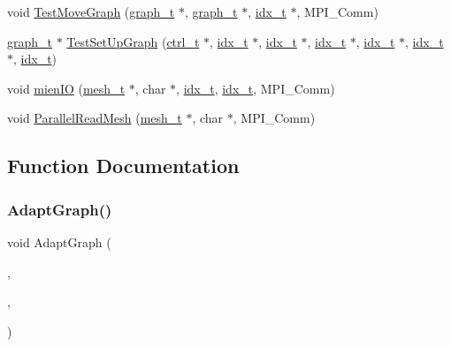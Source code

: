 \begin{DoxyCompactItemize}
\item 
void \hyperlink{a00954_a646249107ea9150124408b418ad61f15}{Test\+Move\+Graph} (\hyperlink{a00734}{graph\+\_\+t} $\ast$, \hyperlink{a00734}{graph\+\_\+t} $\ast$, \hyperlink{a00876_aaa5262be3e700770163401acb0150f52}{idx\+\_\+t} $\ast$, M\+P\+I\+\_\+\+Comm)
\item 
\hyperlink{a00734}{graph\+\_\+t} $\ast$ \hyperlink{a00954_a7a8b23842a3717196aec03bb4b8704bd}{Test\+Set\+Up\+Graph} (\hyperlink{a00742}{ctrl\+\_\+t} $\ast$, \hyperlink{a00876_aaa5262be3e700770163401acb0150f52}{idx\+\_\+t} $\ast$, \hyperlink{a00876_aaa5262be3e700770163401acb0150f52}{idx\+\_\+t} $\ast$, \hyperlink{a00876_aaa5262be3e700770163401acb0150f52}{idx\+\_\+t} $\ast$, \hyperlink{a00876_aaa5262be3e700770163401acb0150f52}{idx\+\_\+t} $\ast$, \hyperlink{a00876_aaa5262be3e700770163401acb0150f52}{idx\+\_\+t} $\ast$, \hyperlink{a00876_aaa5262be3e700770163401acb0150f52}{idx\+\_\+t})
\item 
void \hyperlink{a00954_a855b1b16b584ec260a2bdac3f03c6de5}{mien\+IO} (\hyperlink{a00738}{mesh\+\_\+t} $\ast$, char $\ast$, \hyperlink{a00876_aaa5262be3e700770163401acb0150f52}{idx\+\_\+t}, \hyperlink{a00876_aaa5262be3e700770163401acb0150f52}{idx\+\_\+t}, M\+P\+I\+\_\+\+Comm)
\item 
void \hyperlink{a00954_ad1d29ead9f4773175b1f6bbdccf4b44c}{Parallel\+Read\+Mesh} (\hyperlink{a00738}{mesh\+\_\+t} $\ast$, char $\ast$, M\+P\+I\+\_\+\+Comm)
\end{DoxyCompactItemize}


\subsection{Function Documentation}
\mbox{\label{a00954_a6ff2574c60e68baf64eeab1b37f73cdf}} 
\subsubsection{\texorpdfstring{Adapt\+Graph()}{AdaptGraph()}}
{\footnotesize\ttfamily void Adapt\+Graph (\begin{DoxyParamCaption}\item[{\hyperlink{a00734}{graph\+\_\+t} $\ast$}]{,  }\item[{\hyperlink{a00876_aaa5262be3e700770163401acb0150f52}{idx\+\_\+t}}]{,  }\item[{M\+P\+I\+\_\+\+Comm}]{ }\end{DoxyParamCaption})}

